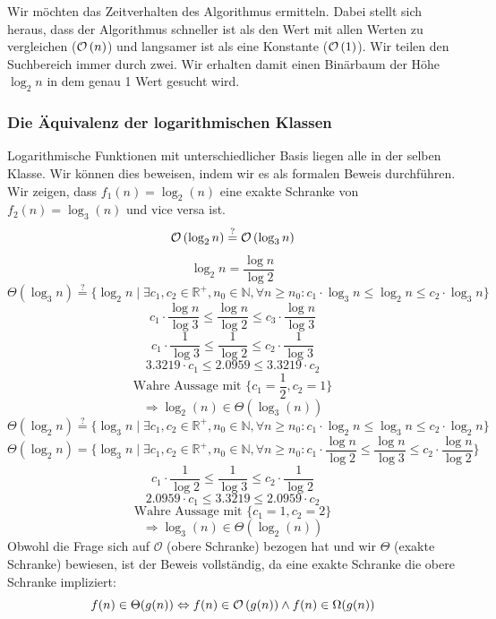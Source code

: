 Wir möchten das Zeitverhalten des Algorithmus ermitteln. Dabei stellt sich heraus, dass der Algorithmus schneller ist als den Wert mit allen Werten zu vergleichen ($\mathcal{O}\left(n\right)$) und langsamer ist als eine Konstante ($\mathcal{O}\left(1\right)$). Wir teilen den Suchbereich immer durch zwei. Wir erhalten damit einen Binärbaum der Höhe $\log_2{n}$ in dem genau 1 Wert gesucht wird.

\subsubsection{Die Äquivalenz der logarithmischen Klassen}
%
Logarithmische Funktionen mit unterschiedlicher Basis liegen alle in der selben Klasse. Wir können dies beweisen, indem wir es als formalen Beweis durchführen. Wir zeigen, dass $f_1(n) = \log_2(n)$ eine exakte Schranke von $f_2(n) = \log_3(n)$ und vice versa ist.
\[
  \mathcal{O}\left(\log_2{n}\right) \stackrel{?}{=} \mathcal{O}\left(\log_3{n}\right)
\] \[
  \log_2{n} = \frac{\log{n}}{\log{2}}
\] \[
 \Theta(\log_3{n}) \stackrel{?}{=} \{ \log_2{n} \mid \exists c_1, c_2 \in \mathbb{R}^+, n_0 \in \mathbb{N},
                      \forall n \geq n_0: c_1 \cdot \log_3{n} \leq \log_2{n} \leq c_2 \cdot \log_3{n} \}
\] \[
  c_1 \cdot \frac{\log{n}}{\log{3}} \leq \frac{\log{n}}{\log{2}} \leq c_3 \cdot \frac{\log{n}}{\log{3}}
\] \[
  c_1 \cdot \frac{1}{\log{3}} \leq \frac{1}{\log{2}} \leq c_2 \cdot \frac{1}{\log{3}}
\] \[
  3.3219 \cdot c_1 \leq 2.0959 \leq 3.3219 \cdot c_2
\] \[
  \text{Wahre Aussage mit } \{c_1 = \frac12, c_2 = 1\}
\] \[
  \Rightarrow \log_2(n) \in \Theta(\log_3(n))
\] \[
  \Theta(\log_2{n}) \stackrel{?}{=} \{ \log_3{n} \mid \exists c_1, c_2 \in \mathbb{R}^+, n_0 \in \mathbb{N},
                      \forall n \geq n_0: c_1 \cdot \log_2{n} \leq \log_3{n} \leq c_2 \cdot \log_2{n} \}
\] \[
  \Theta(\log_2{n}) = \{ \log_3{n} \mid \exists c_1, c_2 \in \mathbb{R}^+, n_0 \in \mathbb{N},
                      \forall n \geq n_0: c_1 \cdot \frac{\log{n}}{\log{2}} \leq \frac{\log{n}}{\log{3}} \leq c_2 \cdot \frac{\log{n}}{\log{2}} \}
\] \[
  c_1 \cdot \frac{1}{\log{2}} \leq \frac{1}{\log{3}} \leq c_2 \cdot \frac{1}{\log{2}}
\] \[
  2.0959 \cdot c_1 \leq 3.3219 \leq 2.0959 \cdot c_2
\] \[
  \text{Wahre Aussage mit } \{c_1 = 1, c_2 = 2\}
\] \[
  \Rightarrow \log_3(n) \in \Theta(\log_2(n))
\]
%
Obwohl die Frage sich auf $\mathcal{O}$ (obere Schranke) bezogen hat und wir $\Theta$ (exakte Schranke) bewiesen, ist der Beweis vollständig, da eine exakte Schranke die obere Schranke impliziert:
\[
   f(n) \in \Theta(g(n)) \Leftrightarrow f(n) \in \mathcal{O}\left(g(n)\right) \land f(n) \in \Omega(g(n))
\]


